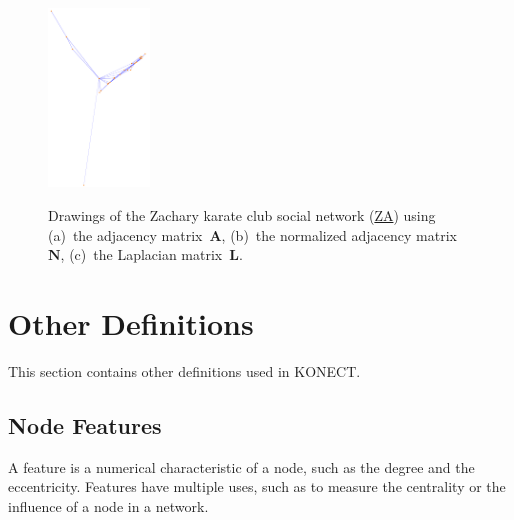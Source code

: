 \documentclass{article}
\newcommand{\wFour}{0.24\textwidth}
\begin{document}
\begin{figure}
{    \includegraphics[width=\wFour]{plot/map.lap.ax.ucidata-zachary}}
  \caption{ Drawings of the Zachary karate club social network
    (\href{http://konect.cc/networks/ucidata-zachary/}{\textsf{ZA}})
    using (a)~the adjacency matrix~$\mathbf A$, (b)~the normalized
    adjacency matrix~$\mathbf N$, (c)~the Laplacian matrix~$\mathbf L$.
    \label{fig:map.ax}
  }
\end{figure}

\section{Other Definitions}
\label{sec:other}
This section contains other definitions used in KONECT. 

\subsection{Node Features}
\label{sec:features}
A feature is a numerical characteristic of a node, such as the degree
and the eccentricity.  Features have multiple uses, such as to measure
the centrality or the influence of a node in a network. 
\end{document}
